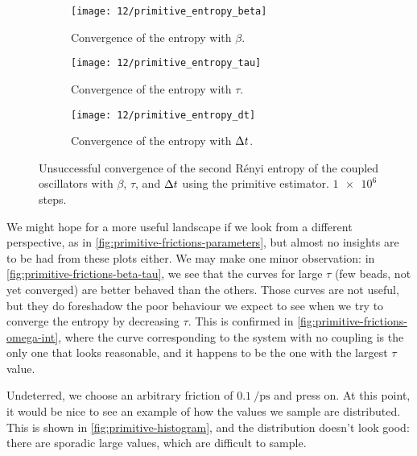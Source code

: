 \begin{figure}
	\setlength{\figspacing}{5 mm}
	\centering
	\begin{subfigure}[b]{\textwidth}
		\texttt{[image: 12/primitive\_entropy\_beta]}
		\caption{
			Convergence of the entropy with $\beta$.
		}
		\label{fig:primitive-entropy-beta}
		\vspace{\figspacing}
	\end{subfigure}
	\begin{subfigure}[b]{\textwidth}
		\texttt{[image: 12/primitive\_entropy\_tau]}
		\caption{
			Convergence of the entropy with $\tau$.
		}
		\label{fig:primitive-entropy-tau}
		\vspace{\figspacing}
	\end{subfigure}
	\begin{subfigure}[b]{\textwidth}
		\texttt{[image: 12/primitive\_entropy\_dt]}
		\caption{
			Convergence of the entropy with $\Delta t$.
		}
		\label{fig:primitive-entropy-dt}
	\end{subfigure}
	\caption[
		Convergence of entropy with primitive estimator
	]{
		Unsuccessful convergence of the second Rényi entropy of the coupled oscillators with $\beta$, $\tau$, and $\Delta t$ using the primitive estimator.
		$\num{1e6}$ steps.
		\explainplotentropy{}
	}
\end{figure}

We might hope for a more useful landscape if we look from a different perspective, as in \cref{fig:primitive-frictions-parameters}, but almost no insights are to be had from these plots either.
We may make one minor observation: in \cref{fig:primitive-frictions-beta-tau}, we see that the curves for large $\tau$ (few beads, not yet converged) are better behaved than the others.
Those curves are not useful, but they do foreshadow the poor behaviour we expect to see when we try to converge the entropy by decreasing $\tau$.
This is confirmed in \cref{fig:primitive-frictions-omega-int}, where the curve corresponding to the system with no coupling is the only one that looks reasonable, and it happens to be the one with the largest $\tau$ value.

Undeterred, we choose an arbitrary friction of $\SI{0.1}{\per\pico\second}$ and press on.
At this point, it would be nice to see an example of how the values we sample are distributed.
This is shown in \cref{fig:primitive-histogram}, and the distribution doesn't look good: there are sporadic large values, which are difficult to sample.

